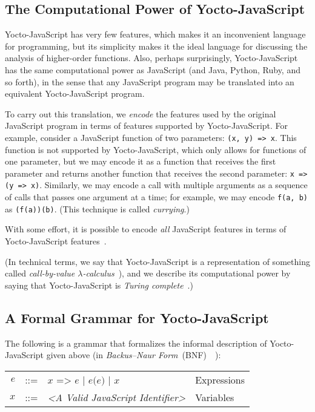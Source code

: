 \documentclass[12pt, oneside]{book}
\begin{document}
\subsection{The Computational Power of Yocto-JavaScript}

Yocto-JavaScript has very few features, which makes it an inconvenient language for programming, but its simplicity makes it the ideal language for discussing the analysis of higher-order functions. Also, perhaps surprisingly, Yocto-JavaScript has the same computational power as JavaScript (and Java, Python, Ruby, and so forth), in the sense that any JavaScript program may be translated into an equivalent Yocto-JavaScript program.

To carry out this translation, we \emph{encode} the features used by the original JavaScript program in terms of features supported by Yocto-JavaScript. For example, consider a JavaScript function of two parameters: \texttt{(x, y) => x}. This function is not supported by Yocto-JavaScript, which only allows for functions of one parameter, but we may encode it as a function that receives the first parameter and returns another function that receives the second parameter: \texttt{x => (y => x)}. Similarly, we may encode a call with multiple arguments as a sequence of calls that passes one argument at a time; for example, we may encode \texttt{f(a, b)} as \texttt{(f(a))(b)}. (This technique is called \emph{currying}.)

With some effort, it is possible to encode \emph{all} JavaScript features in terms of Yocto-JavaScript features~\cite[§~6]{understanding-computation}.

(In technical terms, we say that Yocto-JavaScript is a representation of something called \emph{call-by-value $\lambda$-calculus}~\cite[§~6]{understanding-computation}), and we describe its computational power by saying that Yocto-JavaScript is \emph{Turing complete}~\cite[§~7]{understanding-computation}.)

\subsection{A Formal Grammar for Yocto-JavaScript}

The following is a grammar that formalizes the informal description of Yocto-JavaScript given above (in \emph{Backus–Naur Form}~(BNF)~\cite{bnf}~\cite[§~4.2]{dragon-book}):

\begin{center}
\begin{tabular}{rcll}
$e$ & ::= & $x\texttt{ => }e$ | $e\texttt{(}e\texttt{)}$ | $x$ & Expressions \\
$x$ & ::= & \emph{<A Valid JavaScript Identifier>} & Variables \\
\end{tabular}
\end{center}
\end{document}
